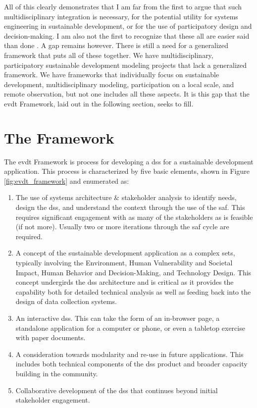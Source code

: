 All of this clearly demonstrates that I am far from the first to argue that such multidisciplinary integration is necessary, for the potential utility for systems engineering in sustainable development, or for the use of participatory design and decision-making. I am also not the first to recognize that these all are easier said than done \cite{shahumyanIntegrationLandUse2017}. A gap remains however. There is still a need for a generalized framework that puts all of these together. We have multidisciplinary, participatory sustainable development modeling projects that lack a generalized framework. We have frameworks that individually focus on sustainable development, multidisciplinary modeling, participation on a local scale, and remote observation, but not one includes all these aspects. It is this gap that the \ac{evdt} Framework, laid out in the following section, seeks to fill.

\section{The Framework} \label{sec:framework}

The \ac{evdt} Framework is process for developing a \ac{dss} for a sustainable development application. This process is characterized by five basic elements, shown in Figure \ref{fig:evdt_framework} and enumerated as: 

\begin{enumerate}[label=\emph{\Alph*)},itemsep=0pt,parsep=0pt]
	\item{The use of systems architecture \& stakeholder analysis to identify needs, design the \ac{dss}, and understand the context through the use of the \acf{saf}. This requires significant engagement with as many of the stakeholders as is feasible (if not more). Usually two or more iterations through the \ac{saf} cycle are required.}
	\item{A concept of the sustainable development application as a complex \ac{sets}, typically involving the Environment, Human Vulnerability and Societal Impact, Human Behavior and Decision-Making, and Technology Design. This concept undergirds the \ac{dss} architecture and is critical as it provides the capability both for detailed technical analysis as well as feeding back into the design of data collection systems. \label{item:evdt}}
	\item{An interactive \ac{dss}. This can take the form of an in-browser page, a standalone application for a computer or phone, or even a tabletop exercise with paper documents.}
	\item{A consideration towards modularity and re-use in future applications. This includes both technical components of the \ac{dss} product and broader capacity building in the community.}
	\item{Collaborative development of the \ac{dss} that continues beyond initial stakeholder engagement.}
\end{enumerate}


